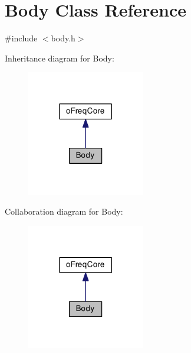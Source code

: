 \hypertarget{class_body}{\section{Body Class Reference}
\label{class_body}
}


{\ttfamily \#include $<$body.\-h$>$}



Inheritance diagram for Body\-:\nopagebreak
\begin{figure}[H]
\begin{center}
\leavevmode
\includegraphics[width=146pt]{class_body__inherit__graph}
\end{center}
\end{figure}


Collaboration diagram for Body\-:\nopagebreak
\begin{figure}[H]
\begin{center}
\leavevmode
\includegraphics[width=146pt]{class_body__coll__graph}
\end{center}
\end{figure}
